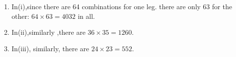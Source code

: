 \documentclass[a4paper,12pt]{article}
\begin{document}
\begin{enumerate}
\begin{framed}
(iv) The colour sequence (upper, middle, lower) on the right leg is now restricted to be different from that on the left leg.  Subject to this overriding condition, calculate the numbers of different possible colour combinations in the cases (i), (ii) and (iii) respectively. 
\end{framed}
\item In(i),since there are 64 combinations for one leg. there are only 63 for the other:
$64 \times 63 = 4032$ in all.
\item In(ii),similarly ,there are $36 \times 35 = 1260$.
\item In(iii), similarly, there are $24 \times 23 = 552$.
\end{enumerate}
\end{document}
